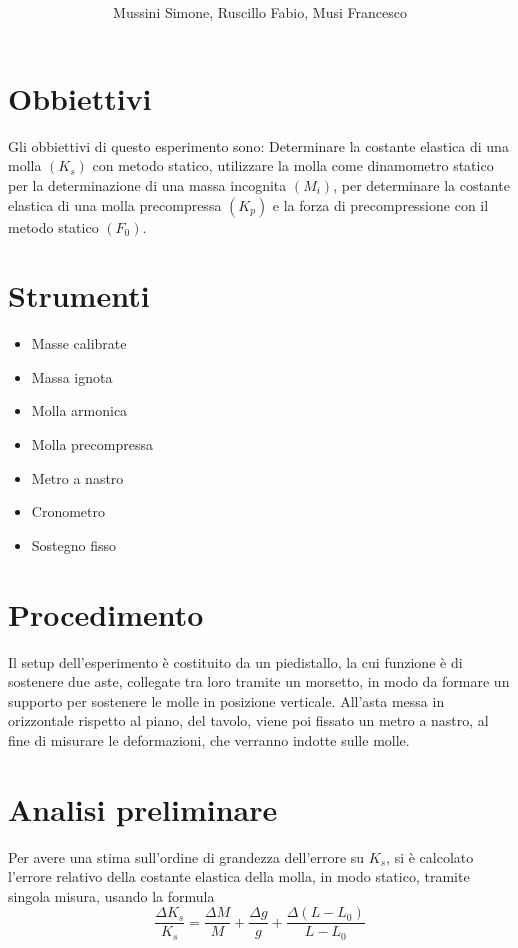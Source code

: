 \documentclass[12pt, a4paper]{article}
\title{\textbf{\scalebox{1.4}{\text{{\Huge Molla}}}}}
\date{}
\author{\begin{small}Mussini Simone, Ruscillo Fabio, Musi Francesco\end{small}}
\begin{document}
\maketitle


\section{Obbiettivi}
Gli obbiettivi di questo esperimento sono: 
Determinare la costante elastica di una molla $(K_s)$ con metodo statico,  utilizzare la molla come dinamometro statico per la determinazione di una massa incognita $(M_i)$, per determinare la costante elastica di una molla precompressa $(K_p)$ e la forza di precompressione con il metodo statico $(F_0)$.


\section{Strumenti}
    \begin{itemize}
        \item Masse calibrate
        \item Massa ignota 
        \item Molla armonica   
        \item Molla precompressa 
        \item Metro a nastro 
        \item Cronometro 
        \item Sostegno fisso 
    \end{itemize}

    
\section{Procedimento}
Il setup dell'esperimento è costituito da un piedistallo, la cui funzione è di sostenere due aste, collegate tra loro tramite un morsetto, in modo da formare un supporto per sostenere le molle in posizione verticale.
All'asta messa in orizzontale rispetto al piano, del tavolo, viene poi fissato un metro a nastro, al fine di misurare le deformazioni, che verranno indotte sulle molle. 



\section{Analisi preliminare}
Per avere una stima sull'ordine di grandezza dell'errore su $K_s$, si è calcolato l'errore relativo della costante elastica della molla, in modo statico, tramite singola misura, usando la formula 
\begin{equation*}
    \frac{\Delta K_s}{K_s}=\frac{\Delta M}{M}+\frac{\Delta g}{g}+ \frac{\Delta (L-L_0)}{L-L_0}
\end{equation*}
\end{document}
